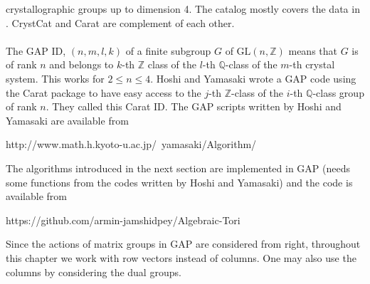 \documentclass[a4paper, 14pt]{extarticle}
\theoremstyle{plain}
\theoremstyle{definition}
\newcommand{\Z}{\ensuremath{\mathbb{Z}}}
\newcommand{\Q}{\ensuremath{\mathbb{Q}}}
\begin{document}
crystallographic groups up to dimension 4. The catalog mostly covers the data in 
\cite{Crystallography}. CrystCat and Carat are complement of each other. \\
\\
The GAP ID, $(n,m,l,k)$ of a finite subgroup $G$ of $\mathrm{GL}(n,\Z)$ means that 
$G$ is of rank $n$ and belongs to $k$-th $\Z$ class of the $l$-th $\Q$-class of the 
$m$-th crystal system. This works for $2\leq n \leq 4$. Hoshi and Yamasaki wrote 
a GAP code using the Carat package to have easy access to the $j$-th $\Z$-class 
of the $i$-th $\Q$-class group of rank $n$. They called this Carat ID. The GAP 
scripts written by Hoshi and Yamasaki are available from
\begin{center}
http://www.math.h.kyoto-u.ac.jp/~yamasaki/Algorithm/
\end{center}
The algorithms introduced in the next section are implemented in GAP (needs some 
functions from the codes written by Hoshi and Yamasaki) and the code is available from
\begin{center}
https://github.com/armin-jamshidpey/Algebraic-Tori
\end{center}
Since the actions of matrix groups in GAP are considered from right, throughout 
this chapter we work with row vectors instead of columns. One may also use the 
columns by considering the dual groups.
\end{document}
